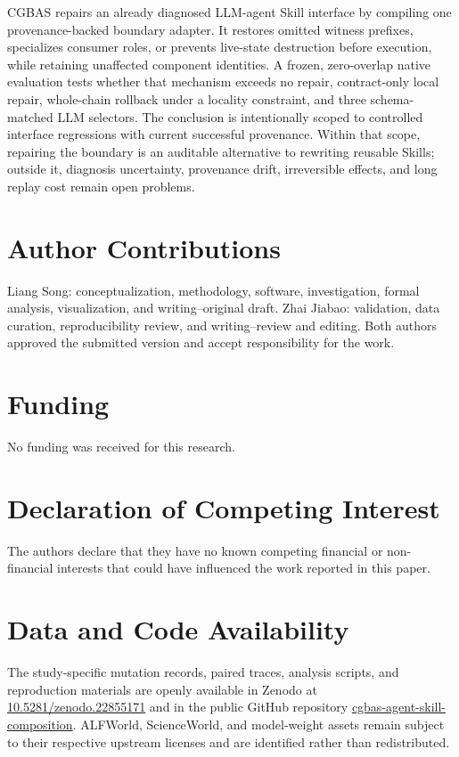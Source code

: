 \documentclass[10pt]{article}
\begin{document}
CGBAS repairs an already diagnosed LLM-agent Skill interface by compiling one
provenance-backed boundary adapter. It restores omitted witness prefixes,
specializes consumer roles, or prevents live-state destruction before execution,
while retaining unaffected component identities. A frozen, zero-overlap native
evaluation tests whether that mechanism exceeds no repair, contract-only local
repair, whole-chain rollback under a locality constraint, and three schema-matched
LLM selectors. The conclusion is intentionally scoped to controlled interface
regressions with current successful provenance. Within that scope, repairing the
boundary is an auditable alternative to rewriting reusable Skills; outside it,
diagnosis uncertainty, provenance drift, irreversible effects, and long replay
cost remain open problems.
\section*{Author Contributions}
Liang Song: conceptualization, methodology, software, investigation, formal
analysis, visualization, and writing--original draft. Zhai Jiabao: validation,
data curation, reproducibility review, and writing--review and editing. Both
authors approved the submitted version and accept responsibility for the work.

\section*{Funding}
No funding was received for this research.

\section*{Declaration of Competing Interest}
The authors declare that they have no known competing financial or non-financial
interests that could have influenced the work reported in this paper.

\section*{Data and Code Availability}
The study-specific mutation records, paired traces, analysis scripts, and
reproduction materials are openly available in Zenodo at
\href{https://doi.org/10.5281/zenodo.22855171}{10.5281/zenodo.22855171} and in
the public GitHub repository
\href{https://github.com/ls680/cgbas-agent-skill-composition}{cgbas-agent-skill-composition}.
ALFWorld, ScienceWorld, and model-weight assets remain subject to their
respective upstream licenses and are identified rather than redistributed.
\end{document}
